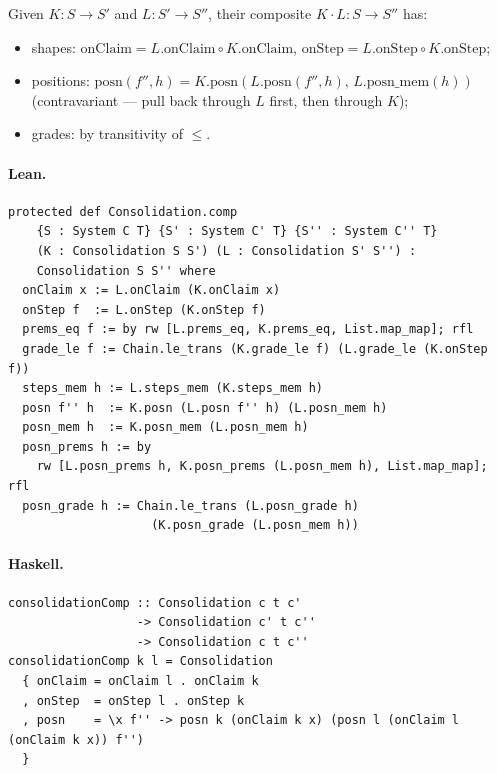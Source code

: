 \documentclass[11pt,a4paper]{article}
\begin{document}
\begin{defn}
Given $K : S \to S'$ and $L : S' \to S''$, their composite $K \cdot L :
S \to S''$ has:
\begin{itemize}
  \item shapes: $\mathrm{onClaim} = L.\mathrm{onClaim} \circ K.\mathrm{onClaim}$,
    $\mathrm{onStep} = L.\mathrm{onStep} \circ K.\mathrm{onStep}$;
  \item positions: $\mathrm{posn}(f'', h) =
    K.\mathrm{posn}(L.\mathrm{posn}(f'', h),\, L.\mathrm{posn\_mem}(h))$
    (contravariant --- pull back through $L$ first, then through $K$);
  \item grades: by transitivity of $\le$.
\end{itemize}
\end{defn}

\paragraph{Lean.}
\begin{lstlisting}[style=lean]
protected def Consolidation.comp
    {S : System C T} {S' : System C' T} {S'' : System C'' T}
    (K : Consolidation S S') (L : Consolidation S' S'') :
    Consolidation S S'' where
  onClaim x := L.onClaim (K.onClaim x)
  onStep f  := L.onStep (K.onStep f)
  prems_eq f := by rw [L.prems_eq, K.prems_eq, List.map_map]; rfl
  grade_le f := Chain.le_trans (K.grade_le f) (L.grade_le (K.onStep f))
  steps_mem h := L.steps_mem (K.steps_mem h)
  posn f'' h  := K.posn (L.posn f'' h) (L.posn_mem h)
  posn_mem h  := K.posn_mem (L.posn_mem h)
  posn_prems h := by
    rw [L.posn_prems h, K.posn_prems (L.posn_mem h), List.map_map]; rfl
  posn_grade h := Chain.le_trans (L.posn_grade h)
                    (K.posn_grade (L.posn_mem h))
\end{lstlisting}

\paragraph{Haskell.}
\begin{lstlisting}[style=haskell]
consolidationComp :: Consolidation c t c'
                  -> Consolidation c' t c''
                  -> Consolidation c t c''
consolidationComp k l = Consolidation
  { onClaim = onClaim l . onClaim k
  , onStep  = onStep l . onStep k
  , posn    = \x f'' -> posn k (onClaim k x) (posn l (onClaim l (onClaim k x)) f'')
  }
\end{lstlisting}
\end{document}
